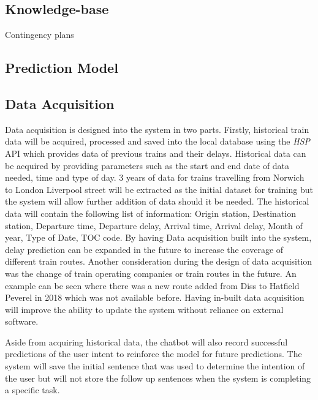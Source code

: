 \documentclass[11pt]{article}
\begin{document}
\subsection{Knowledge-base}
Contingency plans

\subsection{Prediction Model}


\subsection{Data Acquisition}
Data acquisition is designed into the system in two parts. Firstly, historical train data will be acquired, processed and saved into the local database using the \textit{HSP} API which provides data of previous trains and their delays. Historical data can be acquired by providing parameters such as the start and end date of data needed, time and type of day. 3 years of data for trains travelling from Norwich to London Liverpool street will be extracted as the initial dataset for training but the system will allow further addition of data should it be needed. The historical data will contain the following list of information: Origin station, Destination station, Departure time, Departure delay, Arrival time, Arrival delay, Month of year, Type of Date, TOC code. By having Data acquisition built into the system, delay prediction can be expanded in the future to increase the coverage of different train routes. Another consideration during the design of data acquisition was the change of train operating companies or train routes in the future. An example can be seen where there was a new route added from Diss to Hatfield Peverel in 2018 which was not available before. Having in-built data acquisition will improve the ability to update the system without reliance on external software.

Aside from acquiring historical data, the chatbot will also record successful predictions of the user intent to reinforce the model for future predictions. The system will save the initial sentence that was used to determine the intention of the user but will not store the follow up sentences when the system is completing a specific task.
\end{document}
